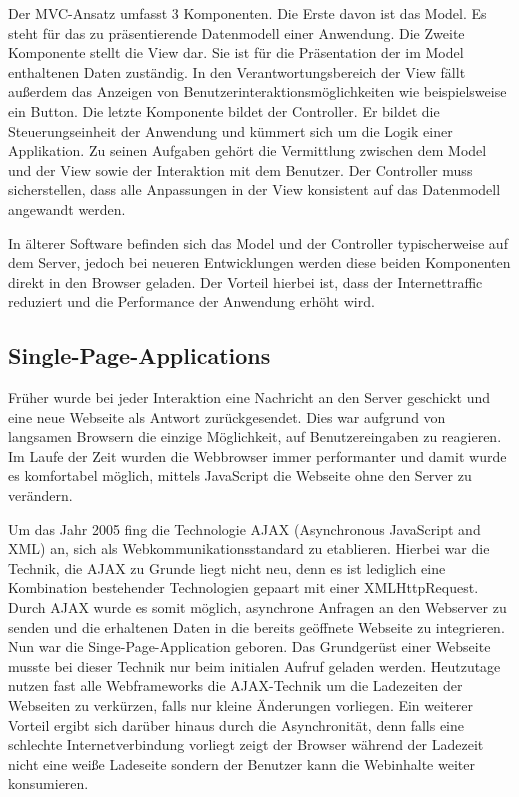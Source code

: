 Der MVC-Ansatz umfasst 3 Komponenten. Die Erste davon ist das Model. Es steht für das zu präsentierende Datenmodell einer Anwendung. Die Zweite Komponente stellt die View dar. Sie ist für die Präsentation der im Model enthaltenen Daten zuständig. In den Verantwortungsbereich der View fällt außerdem das Anzeigen von Benutzerinteraktionsmöglichkeiten wie beispielsweise ein Button. Die letzte Komponente bildet der Controller. Er bildet die Steuerungseinheit der Anwendung und kümmert sich um die Logik einer Applikation. Zu seinen Aufgaben gehört die Vermittlung zwischen dem Model und der View sowie der Interaktion mit dem Benutzer. Der Controller muss sicherstellen, dass alle Anpassungen in der View konsistent auf das Datenmodell angewandt werden.\autocites[vgl.][7\psqq]{Magnucki2017}

In älterer Software befinden sich das Model und der Controller typischerweise auf dem Server, jedoch bei neueren Entwicklungen werden diese beiden Komponenten direkt in den Browser geladen. Der Vorteil hierbei ist, dass der Internettraffic reduziert und die Performance der Anwendung erhöht wird.\autocites[vgl.][7\psqq]{Steyer2017}

\subsection{Single-Page-Applications}

Früher wurde bei jeder Interaktion eine Nachricht an den Server geschickt und eine neue Webseite als Antwort zurückgesendet. Dies war aufgrund von langsamen Browsern die einzige Möglichkeit, auf Benutzereingaben zu reagieren. Im Laufe der Zeit wurden die Webbrowser immer performanter und damit wurde es komfortabel möglich, mittels JavaScript die Webseite ohne den Server zu verändern. 

Um das Jahr 2005 fing die Technologie AJAX (Asynchronous JavaScript and XML) an, sich als Webkommunikationsstandard zu etablieren. Hierbei war die Technik, die AJAX zu Grunde liegt nicht neu, denn es ist lediglich eine Kombination bestehender Technologien gepaart mit einer XMLHttpRequest. Durch AJAX wurde es somit möglich, asynchrone Anfragen an den Webserver zu senden und die erhaltenen Daten in die bereits geöffnete Webseite zu integrieren. Nun war die Singe-Page-Application geboren. Das Grundgerüst einer Webseite musste bei dieser Technik nur beim initialen Aufruf geladen werden. Heutzutage nutzen fast alle Webframeworks die AJAX-Technik um die Ladezeiten der Webseiten zu verkürzen, falls nur kleine Änderungen vorliegen. Ein weiterer Vorteil ergibt sich darüber hinaus durch die Asynchronität, denn falls eine schlechte Internetverbindung vorliegt zeigt der Browser während der Ladezeit nicht eine weiße Ladeseite sondern der Benutzer kann die Webinhalte weiter konsumieren.\autocites[vgl.][4]{Fink2014}[vgl.][7\psqq]{Jaeger2008}

